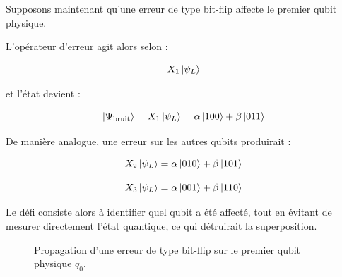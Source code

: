 \documentclass[a4paper,12pt]{article}
\begin{document}
Supposons maintenant qu’une erreur de type bit-flip affecte le premier qubit physique.

L’opérateur d’erreur agit alors selon :

\[
X_1\ket{\psi_L}
\]

et l’état devient :

\[
\ket{\Psi_{\text{bruit}}}
=
X_1\ket{\psi_L}
=
\alpha\ket{100}
+
\beta\ket{011}
\]

De manière analogue, une erreur sur les autres qubits produirait :

\[
X_2\ket{\psi_L}
=
\alpha\ket{010}
+
\beta\ket{101}
\]

\[
X_3\ket{\psi_L}
=
\alpha\ket{001}
+
\beta\ket{110}
\]

Le défi consiste alors à identifier quel qubit a été affecté, tout en évitant de mesurer directement l’état quantique, ce qui détruirait la superposition.

\begin{figure}[H]
\centering
{}
\caption{Propagation d'une erreur de type bit-flip sur le premier qubit physique $q_0$.}
\label{fig:erreur_x_q0}
\end{figure}
\end{document}
